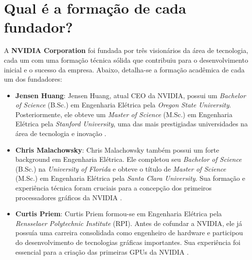\section{Qual é a formação de cada fundador?}

A \textbf{NVIDIA Corporation} foi fundada por três visionários da área de tecnologia, cada um com uma formação técnica sólida que contribuiu para o desenvolvimento inicial e o sucesso da empresa. Abaixo, detalha-se a formação acadêmica de cada um dos fundadores:

\begin{itemize}
    \item \textbf{Jensen Huang}: Jensen Huang, atual CEO da NVIDIA, possui um \textit{Bachelor of Science} (B.Sc.) em Engenharia Elétrica pela \textit{Oregon State University}. Posteriormente, ele obteve um \textit{Master of Science} (M.Sc.) em Engenharia Elétrica pela \textit{Stanford University}, uma das mais prestigiadas universidades na área de tecnologia e inovação \cite{wikipedia_huang}.

    \item \textbf{Chris Malachowsky}: Chris Malachowsky também possui um forte background em Engenharia Elétrica. Ele completou seu \textit{Bachelor of Science} (B.Sc.) na \textit{University of Florida} e obteve o título de \textit{Master of Science} (M.Sc.) em Engenharia Elétrica pela \textit{Santa Clara University}. Sua formação e experiência técnica foram cruciais para a concepção dos primeiros processadores gráficos da NVIDIA \cite{wikipedia_malachowsky}.

    \item \textbf{Curtis Priem}: Curtis Priem formou-se em Engenharia Elétrica pela \textit{Rensselaer Polytechnic Institute} (RPI). Antes de cofundar a NVIDIA, ele já possuía uma carreira consolidada como engenheiro de hardware e participou do desenvolvimento de tecnologias gráficas importantes. Sua experiência foi essencial para a criação das primeiras GPUs da NVIDIA \cite{forbes_priem}.

\end{itemize}